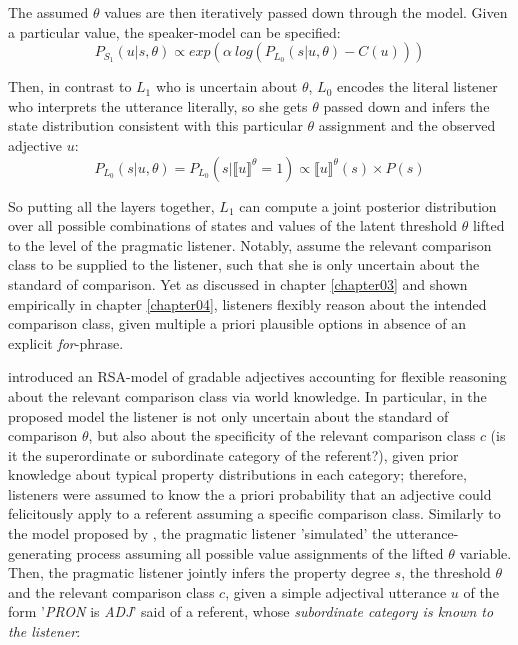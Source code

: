 The assumed $\theta$ values are then iteratively passed down through the model. Given a particular value, the speaker-model can be specified:
$$P_{S_1} (u | s, \theta) \propto exp(\alpha \: log (P_{L_0} (s | u, \theta) - C(u)) )$$

Then, in contrast to $L_1$ who is uncertain about $\theta$, $L_0$ encodes the literal listener who interprets the utterance literally, so she gets $\theta$ passed down and infers the state distribution consistent with this particular $\theta$ assignment and the observed adjective $u$:
$$P_{L_0} (s | u, \theta) = P_{L_0} (s | \llbracket u \rrbracket ^\theta = 1 ) \propto \llbracket u \rrbracket ^\theta (s) \times P(s)$$

So putting all the layers together, $L_1$ can compute a joint posterior distribution over all possible combinations of states and values of the latent threshold $\theta$ lifted to the level of the pragmatic listener. Notably, \textcite{lassiter2013context} assume the relevant comparison class to be supplied to the listener, such that she is only uncertain about the standard of comparison. Yet as discussed in chapter \ref{chapter03} and shown empirically in chapter \ref{chapter04}, listeners flexibly reason about the intended comparison class, given multiple a priori plausible options in absence of an explicit \emph{for}-phrase.

\textcite{tessler2017warm} introduced an RSA-model of gradable adjectives accounting for flexible reasoning about the relevant comparison class via world knowledge. In particular, in the proposed model the listener is not only uncertain about the standard of comparison $\theta$, but also about the specificity of the relevant comparison class $c$ (is it the superordinate or subordinate category of the referent?), given prior knowledge about typical property distributions in each category; therefore, listeners were assumed to know the a priori probability that an adjective could felicitously apply to a referent assuming a specific comparison class.
Similarly to the model proposed by \textcite{lassiter2013context}, the pragmatic listener 'simulated' the utterance-generating process assuming all possible value assignments of the lifted $\theta$ variable.
Then, the pragmatic listener jointly infers the property degree $s$, the threshold $\theta$ and the relevant comparison class $c$, given a simple adjectival utterance $u$ of the form '\emph{PRON} is \emph{ADJ}' said of a referent, whose \emph{subordinate category is known to the listener}:

